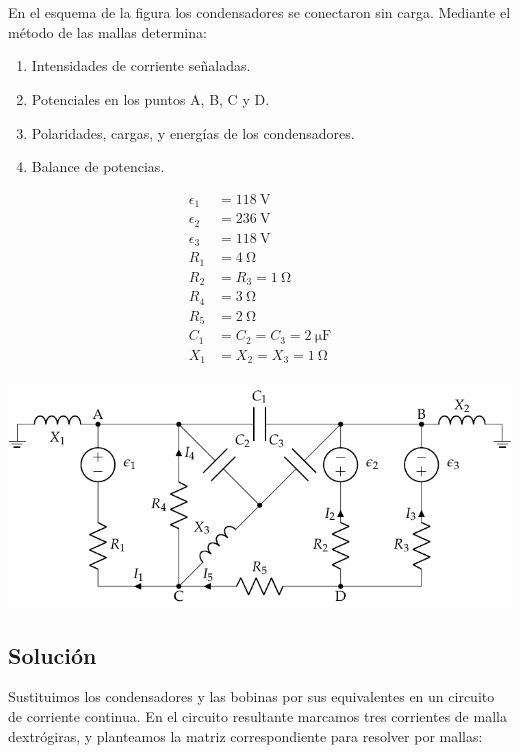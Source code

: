\documentclass[10pt]{article}
\begin{document}
\clearpage

\section{}

En el esquema de la figura los condensadores se conectaron sin
carga. Mediante el método de las mallas determina:
\begin{enumerate}
\item Intensidades de corriente señaladas.
\item Potenciales en los puntos A, B, C y D.
\item Polaridades, cargas, y energías de los condensadores.
\item Balance de potencias.
\end{enumerate}

\begin{minipage}[c]{0.3\linewidth}
  \begin{align*}
    \epsilon_{1}&=\SI{118}{\volt}\\
    \epsilon_{2}&=\SI{236}{\volt}\\
    \epsilon_{3}&=\SI{118}{\volt}\\
    R_{1}&= \SI{4}{\ohm}\\
    R_{2}&=R_{3}=\SI{1}{\ohm}\\
    R_{4}&= \SI{3}{\ohm}\\
    R_{5}&= \SI{2}{\ohm}\\
    C_{1}&=C_{2}=C_{3}=\SI{2}{\micro\farad}\\
    X_1 &= X_2 = X_3 = \SI{1}{\ohm}\\
  \end{align*}
\end{minipage}
\begin{minipage}[c]{0.7\linewidth}
  \includegraphics{figs/mallas_condensadores.pdf}
\end{minipage}

\subsection*{Solución}
Sustituimos los condensadores y las bobinas por sus equivalentes en un circuito de corriente continua. En el circuito resultante marcamos tres corrientes de malla dextrógiras, y planteamos la matriz correspondiente para resolver por mallas: 
\end{document}
